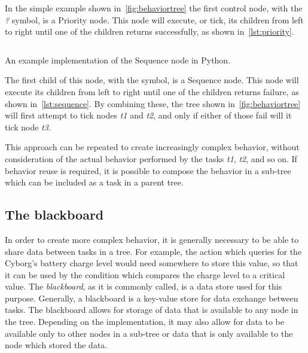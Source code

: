 \documentclass[\rootfolder/main.tex]{subfiles}
\begin{document}
In the simple example shown in~\cref{fig:behaviortree} the first control node, with the \emph{?} symbol, is a Priority node.
This node will execute, or tick, its children from left to right until one of the children returns successfully, as shown in~\cref{lst:priority}.

\begin{listing}
    \inputminted{python}{\rootfolder/Chapters/Chapter2/Listings/sequence.py}
    \caption{An example implementation of the Sequence node in Python.}
    \label{lst:sequence}
\end{listing}

The first child of this node, with the \emph{\rightarrow} symbol, is a Sequence node.
This node will execute its children from left to right until one of the children returns failure, as shown in~\cref{lst:sequence}.
By combining these, the tree shown in~\cref{fig:behaviortree} will first attempt to tick nodes \emph{t1} and \emph{t2}, and only if either of those fail will it tick node \emph{t3}.

This approach can be repeated to create increasingly complex behavior, without consideration of the actual behavior performed by the tasks \emph{t1}, \emph{t2}, and so on.
If behavior reuse is required, it is possible to compose the behavior in a sub-tree which can be included as a task in a parent tree.


\subsection{The blackboard}

In order to create more complex behavior, it is generally necessary to be able to share data between tasks in a tree.
For example, the action which queries for the Cyborg's battery charge level would need somewhere to store this value, so that it can be used by the condition which compares the charge level to a critical value.
The \emph{blackboard}, as it is commonly called, is a data store used for this purpose.
Generally, a blackboard is a key-value store for data exchange between tasks.
The blackboard allows for storage of data that is available to any node in the tree.
Depending on the implementation, it may also allow for data to be available only to other nodes in a sub-tree or data that is only available to the node which stored the data.
\end{document}
